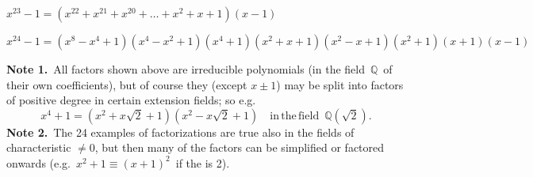 \documentclass[12pt]{article}
\theoremstyle{definition}
\begin{document}
$x^{23}\!-\!1 = (x^{22}\!+\!x^{21}\!+\!x^{20}\!+\ldots+\!x^2\!+\!x\!+\!1)(x\!-\!1)$

$x^{24}\!-\!1 = (x^8\!-\!x^4\!+\!1)(x^4\!-\!x^2\!+\!1)(x^4\!+\!1)(x^2\!+\!x\!+\!1)(x^2\!-\!x\!+\!1)(x^2\!+\!1)(x\!+\!1)(x\!-\!1)$

\textbf{Note 1.}\, All factors shown above are irreducible polynomials (in the field\, $\mathbb{Q}$\, of their own coefficients), but of course they (except $x\!\pm\!1$) may be split into factors of positive degree in certain extension fields; so e.g.
 $$x^4\!+\!1 = (x^2\!+\!x\sqrt{2}\!+\!1)(x^2\!-\!x\sqrt{2}\!+\!1)\quad 
\mathrm{in\,the\,field}\,\,\,\mathbb{Q}(\sqrt{2}).$$
\textbf{Note 2.}\, The 24 examples of factorizations are true also in the fields of characteristic $\neq 0$, but then many of the factors can be simplified or factored onwards (e.g.\, $x^2\!+\!1 \equiv (x\!+\!1)^2$\, if the  is 2).
\end{document}
